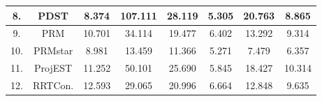 \begin{table}[H]
\begin{tabular}{|c|c|c|c|c|c|c|c|}
\rowcolor[HTML]{C0C0C0} 
8.  & PDST     & 8.374                                                                  & 107.111                                                                                        & 28.119                                                                      & 5.305                                                                                   & 20.763                                                                                   & 8.865                                                                                         \\ \hline
\rowcolor[HTML]{EFEFEF} 
9.  & PRM      & 10.701                                                                 & 34.114                                                                                         & 19.477                                                                      & 6.402                                                                                   & 13.292                                                                                   & 9.314                                                                                         \\ \hline
\rowcolor[HTML]{C0C0C0} 
10. & PRMstar  & 8.981                                                                  & 13.459                                                                                         & 11.366                                                                      & 5.271                                                                                   & 7.479                                                                                    & 6.357                                                                                         \\ \hline
\rowcolor[HTML]{EFEFEF} 
11. & ProjEST  & 11.252                                                                 & 50.101                                                                                         & 25.690                                                                      & 5.845                                                                                   & 18.427                                                                                   & 10.314                                                                                        \\ \hline
\rowcolor[HTML]{C0C0C0} 
12. & RRTCon.  & 12.593                                                                 & 29.065                                                                                         & 20.996                                                                      & 6.664                                                                                   & 12.848                                                                                   & 9.635                                                                                         \\ \hline

\end{tabular}
\end{table}

